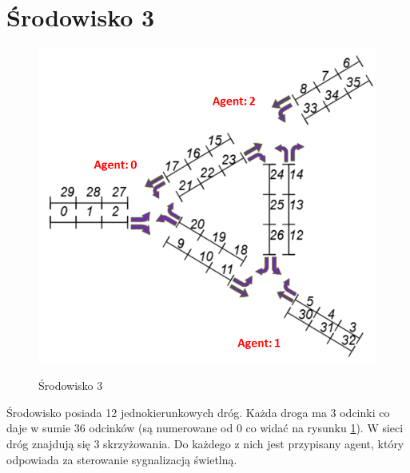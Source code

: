 \documentclass[12pt]{book}
\theoremstyle{plain}
\begin{document}
\section{Środowisko 3}
\begin{figure}[H]
	\centering
	\includegraphics[width=12cm]{images/env_4_agenci_italic_no_perc}
	\label{fig:env_4_agenci}
	\caption{Środowisko 3}
\end{figure}


Środowisko posiada 12 jednokierunkowych dróg. Każda droga ma 3 odcinki co daje w sumie 36 odcinków (są numerowane od 0 co widać na rysunku \ref{fig:env_4_agenci}).
W sieci dróg znajdują się 3 skrzyżowania. Do każdego z nich jest przypisany agent, który odpowiada za sterowanie sygnalizacją świetlną.
\end{document}

